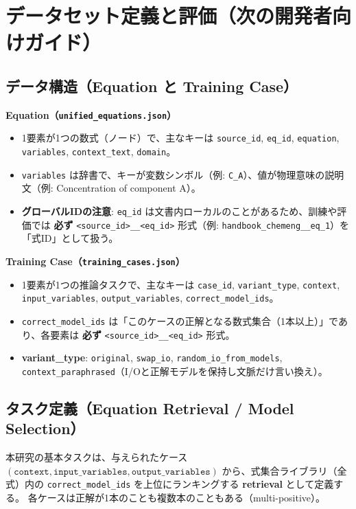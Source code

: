 \documentclass[11pt,a4paper]{jsarticle}
\begin{document}
\section{データセット定義と評価（次の開発者向けガイド）}

\subsection{データ構造（Equation と Training Case）}
\textbf{Equation（\texttt{unified\_equations.json}）}
\begin{itemize}[nosep]
  \item 1要素が1つの数式（ノード）で、主なキーは \texttt{source\_id}, \texttt{eq\_id}, \texttt{equation}, \texttt{variables}, \texttt{context\_text}, \texttt{domain}。
  \item \texttt{variables} は辞書で、キーが変数シンボル（例: \texttt{C\_A}）、値が物理意味の説明文（例: Concentration of component A）。
  \item \textbf{グローバルIDの注意}: \texttt{eq\_id} は文書内ローカルのことがあるため、訓練や評価では \textbf{必ず} \texttt{<source\_id>\_\_<eq\_id>} 形式（例: \texttt{handbook\_chemeng\_\_eq\_1}）を「式ID」として扱う。
\end{itemize}

\textbf{Training Case（\texttt{training\_cases.json}）}
\begin{itemize}[nosep]
  \item 1要素が1つの推論タスクで、主なキーは \texttt{case\_id}, \texttt{variant\_type}, \texttt{context}, \texttt{input\_variables}, \texttt{output\_variables}, \texttt{correct\_model\_ids}。
  \item \texttt{correct\_model\_ids} は「このケースの正解となる数式集合（1本以上）」であり、各要素は \textbf{必ず} \texttt{<source\_id>\_\_<eq\_id>} 形式。
  \item \textbf{variant\_type}: \texttt{original}, \texttt{swap\_io}, \texttt{random\_io\_from\_models}, \texttt{context\_paraphrased}（I/Oと正解モデルを保持し文脈だけ言い換え）。
\end{itemize}

\subsection{タスク定義（Equation Retrieval / Model Selection）}
本研究の基本タスクは、与えられたケース $(\texttt{context}, \texttt{input\_variables}, \texttt{output\_variables})$ から、式集合ライブラリ（全式）内の \texttt{correct\_model\_ids} を上位にランキングする \textbf{retrieval} として定義する。
各ケースは正解が1本のことも複数本のこともある（multi-positive）。
\end{document}
